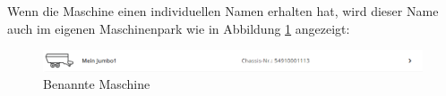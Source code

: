 Wenn die Maschine einen individuellen Namen erhalten hat, wird dieser Name auch im eigenen Maschinenpark wie in Abbildung \ref{fig:benannteMaschine} angezeigt:
 
\begin{figure}[H]
	\centerline{
		\includegraphics[width=1\textwidth, frame]{./grafiken/erm_maschinenpark_benannteMaschine.png}
	}
	\vskip0pt
	\caption{Benannte Maschine} \label{fig:benannteMaschine}
\end{figure}